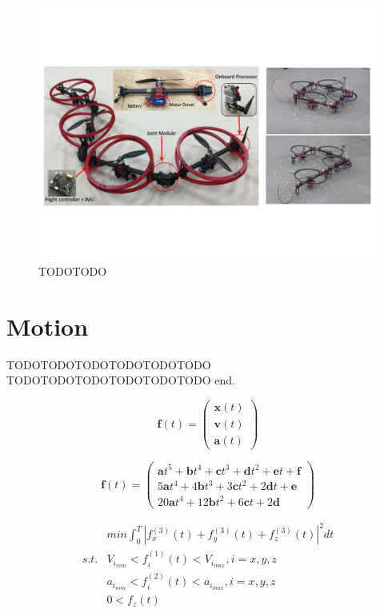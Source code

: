 \documentclass{jarticle}
\begin{document}
\begin{figure}[htb]
  \centering
  \includegraphics[clip, bb= 10 128 777 457,  width=\columnwidth]{figs_orig/figure.pdf}
  \caption{TODOTODO}
  \label{fig:abst-image}
\end{figure}

\section{Motion}


TODOTODOTODOTODOTODOTODO TODOTODOTODOTODOTODOTODO\cite{Morgan:ROS}
end.

\begin{equation}
  \label{eq:temp}
\bm{f}(t) = \left( \begin{array}{c}
  \bm{x}(t) \\
  \bm{v}(t) \\
  \bm{a}(t)
\end{array}\right)
\end{equation}

\begin{equation}
  \label{eq:temp2}
\bm{f}(t) = \left( \begin{array}{c}
  \bm{a}t^5 + \bm{b}t^4 + \bm{c}t^3 + \bm{d}t^2 + \bm{e}t + \bm{f} \\
  5\bm{a}t^4 + 4\bm{b}t^3 + 3\bm{c}t^2 + 2\bm{d}t + \bm{e} \\
  20\bm{a}t^4 + 12\bm{b}t^2 + 6\bm{c}t + 2\bm{d}
\end{array}\right)
\end{equation}


\begin{eqnarray}
  \label{eq:temp3}
 & min{\int_0^T |f^{(3)}_x(t) + f^{(3)}_y(t) + f^{(3)}_z(t)|^2 dt}   \\
  \label{eq:temp4}
s.t. &  V_{i_{min}} < f^{(1)}_i(t) < V_{i_{max}}, i = x, y, z \nonumber \\
  \label{eq:temp5}
 & a_{i_{min}} < f^{(2)}_i(t) < a_{i_{max}}, i = x, y, z \nonumber \\
  \label{eq:temp6} 
 & 0 < f_z(t) \nonumber
\end{eqnarray}
\end{document}
